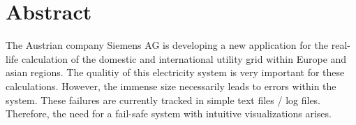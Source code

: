 \section{Abstract}

The Austrian company Siemens AG is developing a new application for the real-life calculation of the domestic and international utility grid within Europe and asian regions. The qualitiy of this electricity system is very important for these calculations. However, the immense size necessarily leads to errors within the system. These failures are currently tracked in simple text files / log files. Therefore, the need for a fail-safe system with intuitive visualizations arises.